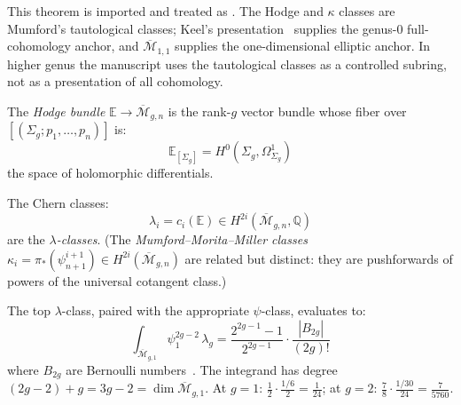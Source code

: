 \begin{remark}
This theorem is imported and treated as \ClaimStatusProvedElsewhere.
The Hodge and $\kappa$ classes are Mumford's tautological classes;
Keel's presentation~\cite{Kee92} supplies the genus-$0$
full-cohomology anchor, and
$\overline{\mathcal M}_{1,1}$ supplies the one-dimensional elliptic
anchor. In higher genus the manuscript uses the tautological classes
as a controlled subring, not as a presentation of all cohomology.
\end{remark}

\begin{definition}
\label{def:hodge-bundle}
The \emph{Hodge bundle} $\mathbb{E} \to \overline{\mathcal{M}}_{g,n}$ is the rank-$g$ vector bundle whose fiber over $[(\Sigma_g; p_1, \ldots, p_n)]$ is:
\begin{equation}
\mathbb{E}_{[\Sigma_g]} = H^0(\Sigma_g, \Omega^1_{\Sigma_g})
\end{equation}
the space of holomorphic differentials.

The Chern classes:
\begin{equation}
\lambda_i = c_i(\mathbb{E}) \in H^{2i}(\overline{\mathcal{M}}_{g,n}, \mathbb{Q})
\end{equation}
are the \emph{$\lambda$-classes}. (The \emph{Mumford--Morita--Miller classes} $\kappa_i = \pi_*(\psi_{n+1}^{i+1}) \in H^{2i}(\overline{\mathcal{M}}_{g,n})$ are related but distinct: they are pushforwards of powers of the universal cotangent class.)
\end{definition}

\begin{theorem}
\label{thm:mumford-formula}
The top $\lambda$-class, paired with the appropriate $\psi$-class, evaluates to:
\begin{equation}\label{eq:faber-pandharipande}
\int_{\overline{\mathcal{M}}_{g,1}} \psi_1^{2g-2}\,\lambda_g = \frac{2^{2g-1}-1}{2^{2g-1}} \cdot \frac{|B_{2g}|}{(2g)!}
\end{equation}
where $B_{2g}$ are Bernoulli numbers~\cite{FP03}. The integrand has degree $(2g-2)+g = 3g-2 = \dim\overline{\mathcal{M}}_{g,1}$. At $g = 1$: $\frac{1}{2} \cdot \frac{1/6}{2} = \frac{1}{24}$; at $g = 2$: $\frac{7}{8} \cdot \frac{1/30}{24} = \frac{7}{5760}$.
\end{theorem}

